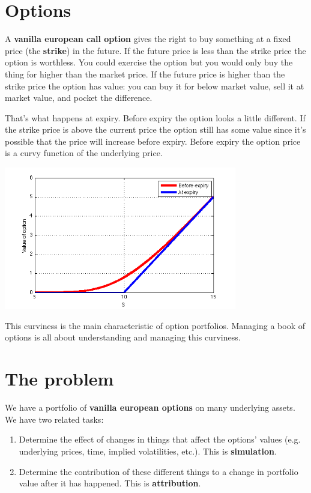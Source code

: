 

\section{Options}

A \textbf{vanilla european call option} gives the right to buy something at a fixed price (the \textbf{strike}) in the future. If the future price is less than the strike price the option is worthless. You could exercise the option but you would only buy the thing for higher than the market price. If the future price is higher than the strike price the option has value: you can buy it for below market value, sell it at market value, and pocket the difference. 

That's what happens at expiry. Before expiry the option looks a little different. If the strike price is above the current price the option still has some value since it's possible that the price will increase before expiry. Before expiry the option price is a curvy function of the underlying price. 

 \begin{center}
\includegraphics[width=4in]{pics/calltT}%
\label{calltT}%
\end{center}

This curviness is the main characteristic of option portfolios. Managing a book of options is all about understanding and managing this curviness. 

\section{The problem}

We have a portfolio of \textbf{vanilla european options} on many underlying assets. We have two related tasks:

\begin{enumerate}
\item Determine the effect of changes in things that affect the options' values (e.g. underlying prices, time, implied volatilities, etc.). This is \textbf{simulation}.
\item Determine the contribution of these different things to a change in portfolio value after it has happened. This is \textbf{attribution}.
\end{enumerate}

